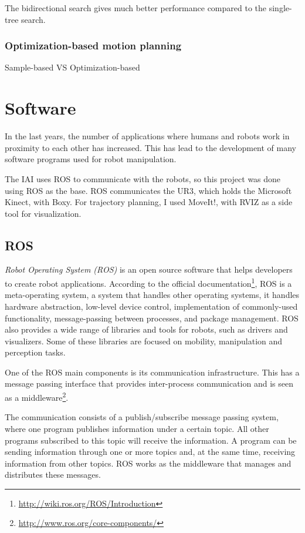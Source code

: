 The bidirectional search gives much better performance compared to the single-tree search.

\subsubsection{Optimization-based motion planning}

Sample-based VS Optimization-based

\section{Software}
In the last years, the number of applications where humans and robots work in proximity to each other has increased. This has lead to the development of many software programs used for robot manipulation. 

The IAI uses ROS to communicate with the robots, so this project was done using ROS as the base. ROS communicates the UR3, which holds the Microsoft Kinect, with Boxy. For trajectory planning, I used MoveIt!, with RVIZ as a side tool for visualization.

\subsection{ROS}

\textit{Robot Operating System (ROS)} is an open source software that helps developers to create robot applications. According to the official documentation\footnote{\url{http://wiki.ros.org/ROS/Introduction}}, ROS is a meta-operating system, a system that handles other operating systems, it handles hardware abstraction, low-level device control, implementation of commonly-used functionality, message-passing between processes, and package management. ROS also provides a wide range of libraries and tools for robots, such as drivers and visualizers. Some of these libraries are focused on mobility, manipulation and perception tasks.

One of the ROS main components is its communication infrastructure. This has a message passing interface that provides inter-process communication and is seen as a middleware\footnote{\url{http://www.ros.org/core-components/}}. 

The communication consists of a publish/subscribe message passing system, where one program publishes information under a certain topic. All other programs subscribed to this topic will receive the information. A program can be sending information through one or more topics and, at the same time, receiving information from other topics. ROS works as the middleware that manages and distributes these messages.


